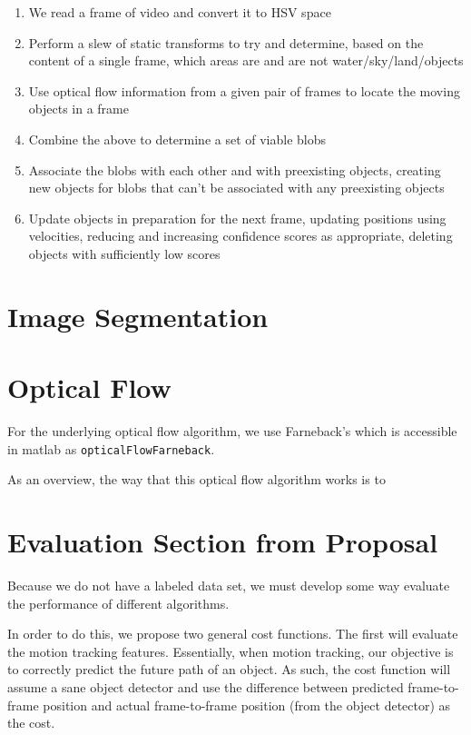 \documentclass{article}
\begin{document}
\begin{enumerate}
\item We read a frame of video and convert it to HSV space
\item Perform a slew of static transforms to try and determine,
      based on the content of a single frame, which areas are and
      are not water/sky/land/objects
\item Use optical flow information from a given pair of frames to
      locate the moving objects in a frame
\item Combine the above to determine a set of viable blobs
\item Associate the blobs with each other and with preexisting objects,
      creating new objects for blobs that can't be associated with any
      preexisting objects
\item Update objects in preparation for the next frame, updating
      positions using velocities, reducing and increasing confidence
      scores as appropriate, deleting objects with sufficiently low
      scores
\end{enumerate}

\section{Image Segmentation}

\section{Optical Flow}

For the underlying optical flow algorithm, we use Farneback's
\cite{farneback2003} which is accessible in matlab as
\texttt{opticalFlowFarneback}.

As an overview, the way that this optical flow algorithm works is to

\section{Evaluation Section from Proposal}

Because we do not have a labeled data set, we must develop
some way evaluate the performance of different algorithms.

In order to do this, we propose two general cost functions.
The first will evaluate the motion tracking features.
Essentially, when motion tracking, our objective is to
correctly predict the future path of an object. As such,
the cost function will assume a sane object detector and
use the difference between predicted frame-to-frame position
and actual frame-to-frame position (from the object detector)
as the cost.
\end{document}
